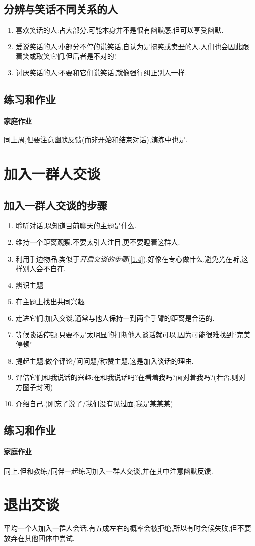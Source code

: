 \documentclass[UTF8]{article}
\newcommand{\ind}{\mbox{\hspace{-1pt}}}
\newcommand{\indList}{\vspace{-6pt}}
\newcommand{\Exer}{\subsection{练习和作业}}
\newcommand{\exer}{\paragraph*{家庭作业}}
\begin{document}
\subsection{分辨与笑话不同关系的人}
\indList
\begin{enumerate}
    \item 喜欢笑话的人:占大部分.可能本身并不是很有幽默感,但可以享受幽默.
    \item 爱说笑话的人:小部分不停的说笑话,\ind 自认为是搞笑或卖丑的人.\ind 人们也会因此跟着笑或取笑它们,\ind 但后者是不对的!
    \item 讨厌笑话的人:不要和它们说笑话,就像强行纠正别人一样.
\end{enumerate}
\indList

\Exer \exer 同上周,但要注意幽默反馈(而非开始和结束对话),演练中也是.

\newpage
\section{加入一群人交谈}

\subsection{加入一群人交谈的步骤\label{6.1}}
\begin{enumerate}
    \item 聆听对话,以知道目前聊天的主题是什么.
    \item 维持一个距离观察.不要太引人注目,更不要瞪着这群人.
    \item 利用手边物品.类似于\emph{开启交谈的步骤}(\ref{1.4}),好像在专心做什么.避免光在听,这样别人会不自在.
    \item 辨识主题
    \item 在主题上找出共同兴趣
    \item 走进它们:加入交谈,通常与他人保持一到两个手臂的距离是合适的.
    \item 等候谈话停顿.只要不是太明显的打断他人谈话就可以,因为可能很难找到``完美停顿''
    \item 提起主题.做个评论/问问题/称赞主题,这是加入谈话的理由.
    \item 评估它们和我说话的兴趣:在和我说话吗?在看着我吗?面对着我吗?(若否,则对方圈子封闭)
    \item 介绍自己.(刚忘了说了/我们没有见过面,我是某某某)
\end{enumerate}
\Exer \exer 同上.但和教练/同伴一起练习加入一群人交谈,并在其中注意幽默反馈.

\section{退出交谈}
平均一个人加入一群人会话,有五成左右的概率会被拒绝,所以有时会候失败,但不要放弃在其他团体中尝试.
\end{document}
